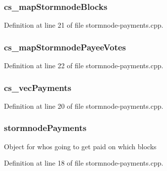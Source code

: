 \subsubsection[{cs\+\_\+map\+Stormnode\+Blocks}]{ cs\+\_\+map\+Stormnode\+Blocks}\label{stormnode-payments_8cpp_ab9dc21266fc508439f6ed0422da8b214}


Definition at line 21 of file stormnode-\/payments.\+cpp.

\hypertarget{stormnode-payments_8cpp_a339b2de1a0d1e6bb993ac7abe7f742d2}{}
\subsubsection[{cs\+\_\+map\+Stormnode\+Payee\+Votes}]{ cs\+\_\+map\+Stormnode\+Payee\+Votes}\label{stormnode-payments_8cpp_a339b2de1a0d1e6bb993ac7abe7f742d2}


Definition at line 22 of file stormnode-\/payments.\+cpp.

\hypertarget{stormnode-payments_8cpp_ad7b9616c84ed22224772799b69d7cbeb}{}
\subsubsection[{cs\+\_\+vec\+Payments}]{ cs\+\_\+vec\+Payments}\label{stormnode-payments_8cpp_ad7b9616c84ed22224772799b69d7cbeb}


Definition at line 20 of file stormnode-\/payments.\+cpp.

\hypertarget{stormnode-payments_8cpp_a1d528b1b067a2f669dfd90c513a97116}{}
\subsubsection[{stormnode\+Payments}]{ stormnode\+Payments}\label{stormnode-payments_8cpp_a1d528b1b067a2f669dfd90c513a97116}
Object for who\textquotesingle{}s going to get paid on which blocks 

Definition at line 18 of file stormnode-\/payments.\+cpp.

